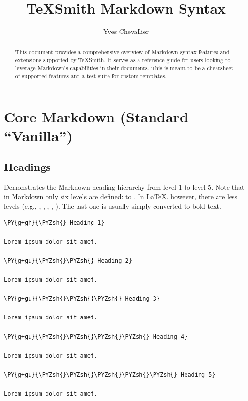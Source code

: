\documentclass[a4paper,twoside]{article}
\title{TeXSmith Markdown Syntax}
\author{Yves Chevallier}\date{}
\begin{document}
\maketitle
\begin{abstract}
This document provides a comprehensive overview of Markdown syntax features and extensions supported by TeXSmith. It serves as a reference guide for users looking to leverage Markdown's capabilities in their documents. This is meant to be a cheatsheet of supported features and a test suite for custom templates.
\end{abstract}
\tableofcontents
\section{Core Markdown (Standard \enquote{Vanilla})}
\subsection{Headings}
Demonstrates the Markdown heading hierarchy from level 1 to level 5. Note that in Markdown only six levels are defined: \tscodeinline{\#} to \tscodeinline{\#\#\#\#\#\#}. In \LaTeX{}, however, there are less levels (e.g., , , , , ). The last one is usually simply converted to bold text.
\begin{tscode}[lang=md, engine=pygments]
\begin{Verbatim}[commandchars=\\\{\},breaklines, breakanywhere, commandchars=\\\{\}]
\PY{g+gh}{\PYZsh{} Heading 1}

Lorem ipsum dolor sit amet.

\PY{g+gu}{\PYZsh{}\PYZsh{} Heading 2}

Lorem ipsum dolor sit amet.

\PY{g+gu}{\PYZsh{}\PYZsh{}\PYZsh{} Heading 3}

Lorem ipsum dolor sit amet.

\PY{g+gu}{\PYZsh{}\PYZsh{}\PYZsh{}\PYZsh{} Heading 4}

Lorem ipsum dolor sit amet.

\PY{g+gu}{\PYZsh{}\PYZsh{}\PYZsh{}\PYZsh{}\PYZsh{} Heading 5}

Lorem ipsum dolor sit amet.
\end{Verbatim}
\end{tscode}
\end{document}
